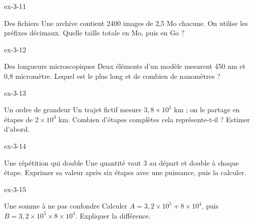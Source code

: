 \begin{blocLivre}{ex-3-11}\begin{exercice}[3]{Des fichiers}
Une archive contient 2400 images de 2,5 Mo chacune. On utilise les préfixes décimaux. Quelle taille totale en Mo, puis en Go ?
\end{exercice}\end{blocLivre}
\begin{blocLivre}{ex-3-12}\begin{exercice}[3]{Des longueurs microscopiques}
Deux éléments d’un modèle mesurent 450 nm et 0,8 micromètre. Lequel est le plus long et de combien de nanomètres ?
\end{exercice}\end{blocLivre}
\begin{blocLivre}{ex-3-13}\begin{exercice}[3]{Un ordre de grandeur}
Un trajet fictif mesure $3{,}8\times10^5$ km ; on le partage en étapes de $2\times10^3$ km. Combien d’étapes complètes cela représente-t-il ? Estimer d’abord.
\end{exercice}\end{blocLivre}
\begin{blocLivre}{ex-3-14}\begin{exercice}[3]{Une répétition qui double}
Une quantité vaut 3 au départ et double à chaque étape. Exprimer sa valeur après six étapes avec une puissance, puis la calculer.
\end{exercice}\end{blocLivre}
\begin{blocLivre}{ex-3-15}\begin{exercice}[3]{Une somme à ne pas confondre}
Calculer $A=3{,}2\times10^5+8\times10^4$, puis $B=3{,}2\times10^5\times8\times10^4$. Expliquer la différence.
\end{exercice}\end{blocLivre}

\clearpage
